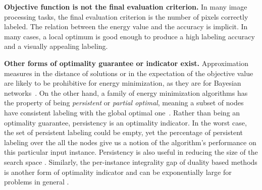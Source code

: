 

\textbf{Objective function is not the final evaluation criterion.} In many image processing tasks, the final evaluation criterion is the number of pixels correctly labeled. The relation between the energy value and the accuracy is implicit. In many cases, a local optimum is good enough to produce a high labeling accuracy and a visually appealing labeling.

\textbf{Other forms of optimality guarantee or indicator exist.} %
%
Approximation measures in the distance of solutions or in the expectation of the objective value are likely to be prohibitive for energy minimization, as they are for Bayesian networks~\cite{Kwisthout-11,Kwisthout-13, kwisthout2015tree}.
On the other hand, a family of energy minimization algorithms has the property of being {\em persistent} or {\em partial optimal}, meaning a subset of nodes have consistent labeling with the global optimal one~\cite{Boros:TR91-maxflow, BorosHammer01}. Rather than being an optimality guarantee, persistency is an optimality indicator. In the worst case, the set of persistent labeling could be empty, yet the percentage of persistent labeling over the all the nodes give us a notion of the algorithm's performance on this particular input instance. Persistency is also useful in reducing the size of the search space \cite{kohli2008partial, SSS-15-IRI}. Similarly, the per-instance integrality gap of duality based methods is another form of optimality indicator and can be exponentially large for problems in general \cite{Komodakis-07, Sontag-12}.



